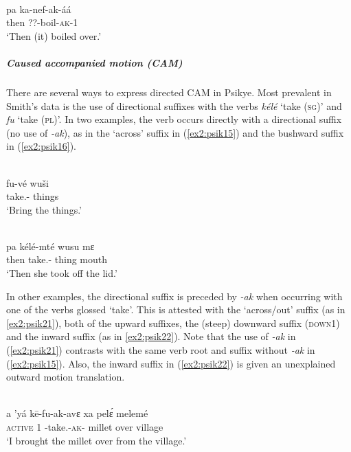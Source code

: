\ex\label{ex2:psik18}
 \\
\gll  pa ka-nef-ak-áá	\\
then ??-boil-\textsc{ak}-1	\\
\glt `Then (it) boiled over.'
\z 

\subparagraph{Caused accompanied motion (CAM)}

There are several ways to express directed CAM in Psikye. Most prevalent in Smith's data is the use of directional suffixes with the verbs \textit{kélé} `take (\textsc{sg})' and \textit{fu} `take (\textsc{pl})'. In two examples, the verb occurs directly with a directional suffix (no use of \textit{-ak}), as in the `across' suffix in (\ref{ex2:psik15}) and the bushward suffix in (\ref{ex2:psik16}).

\ea\label{ex2:psik15}
 \\
\gll  fu-vé wuši	\\
take.- things \\
\glt `Bring the things.'

\ex\label{ex2:psik16}
 \\
\gll pa kélé-mté wusu mɛ	\\
then take.- thing mouth	\\
\glt `Then she took off the lid.'
\z 

In other examples, the directional suffix is preceded by \textit{-ak} when occurring with one of the verbs glossed `take'. This is attested with the `across/out' suffix (as in \ref{ex2:psik21}), both of the upward suffixes, the (steep) downward suffix (\textsc{down1}) and the inward suffix (as in \ref{ex2:psik22}). Note that the use of \textit{-ak} in (\ref{ex2:psik21}) contrasts with the same verb root and suffix without \textit{-ak} in (\ref{ex2:psik15}). Also, the inward suffix in (\ref{ex2:psik22}) is given an unexplained outward motion translation. 

\ea\label{ex2:psik21}
 \\
\gll  a 'yá kē-fu-ak-avɛ xa pelɛ́ melemé	\\
\textsc{active} 1 -take.-\textsc{ak}- millet over village		\\
\glt `I brought the millet over from the village.'
\z 


